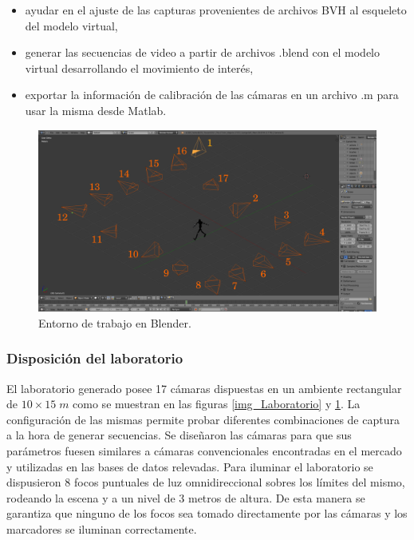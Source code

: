\begin{itemize}
\item  ayudar en  el ajuste de las capturas provenientes de archivos BVH al esqueleto del modelo virtual,
\item	generar las secuencias de video a partir de archivos .blend  con el modelo virtual desarrollando el movimiento de interés,
\item	exportar la información de calibración de las cámaras en un archivo .m para usar la misma desde Matlab.
\end{itemize}


\begin{figure}[!ht]
  \hspace{-1.0cm}
   \includegraphics[scale=0.28]{img/Base_Datos/Entorno_Blender.pdf}
   \caption{Entorno de trabajo en Blender.}
  \label{img_Entorno_Blender}
\end{figure}   


\subsubsection*{Disposición del laboratorio}
El laboratorio generado posee 17 cámaras dispuestas en un ambiente rectangular de $10\times15\;m $ como se muestran en las figuras \ref{img_Laboratorio} y \ref{img_Entorno_Blender}. La configuración de las mismas permite probar diferentes combinaciones de captura a la hora de generar secuencias. Se diseñaron las cámaras para que sus parámetros fuesen similares a cámaras convencionales
 encontradas en el mercado y utilizadas en las bases de datos relevadas. 
Para iluminar el laboratorio se dispusieron $8$ focos puntuales de luz omnidireccional sobres los límites del mismo, rodeando la escena y a un nivel de 3 metros de altura. De esta manera se garantiza que ninguno de los focos sea tomado directamente por las cámaras y los marcadores se iluminan correctamente.
 

